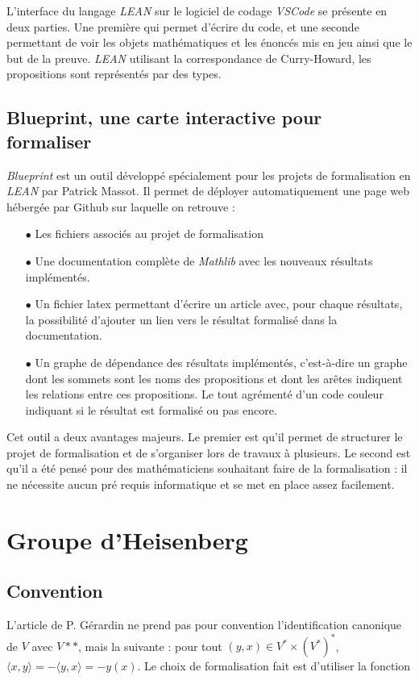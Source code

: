 \documentclass[10pt]{article}
\theoremstyle{definition}
\begin{document}
L'interface du langage \textit{LEAN} sur le logiciel de codage \textit{VSCode} se présente en deux parties. Une première qui permet d'écrire du code, et une seconde permettant de voir les  objets mathématiques et les énoncés mis en jeu ainsi que le but de la preuve. \textit{LEAN} utilisant la correspondance de Curry-Howard, les propositions sont représentés par des types.

\subsection{Blueprint, une carte interactive pour formaliser}

\textit{Blueprint} est un outil développé spécialement pour les projets de formalisation en \textit{LEAN} par Patrick Massot. Il permet de déployer automatiquement une page web hébergée par Github sur laquelle on retrouve : 
\begin{itemize}
	\item [$\bullet$] Les fichiers associés au projet de formalisation
	\item[$\bullet$] Une documentation complète de \textit{Mathlib} avec les nouveaux résultats implémentés.
	\item [$\bullet$] Un fichier latex permettant d'écrire un article avec, pour chaque résultats, la possibilité d'ajouter un lien vers le résultat formalisé dans la documentation.
	\item[$\bullet$] Un graphe de dépendance des résultats implémentés, c'est-à-dire un graphe dont les sommets sont les noms des propositions et dont les arêtes indiquent les relations entre ces propositions. Le tout agrémenté d'un code couleur indiquant si le résultat est formalisé ou pas encore.
\end{itemize}

Cet outil a deux avantages majeurs. Le premier est qu'il permet de structurer le projet de formalisation et de s'organiser lors de travaux à plusieurs. Le second est qu'il a été pensé pour des mathématiciens souhaitant faire de la formalisation : il ne nécessite aucun pré requis informatique et se met en place assez facilement.


\section{Groupe d'Heisenberg}

\subsection{Convention}
L'article de P. Gérardin ne prend pas pour convention l'identification canonique de $V$ avec $V**$, mais la suivante : pour tout $(y,x)\in V^*\times (V^*)^* $, $\langle x, y\rangle = -\langle y,x\rangle = - y(x)$. 
Le choix de formalisation fait est d'utiliser la fonction 
\end{document}
